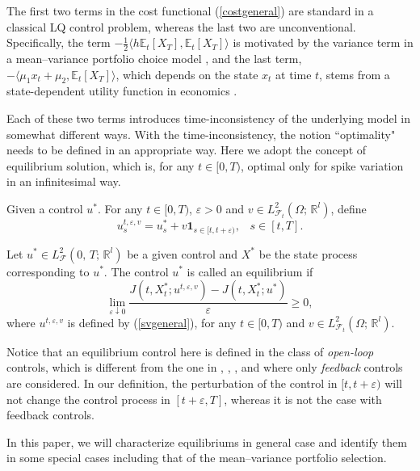 \documentclass[final]{siamltex}
\begin{document}
The first two terms in the cost  functional (\ref{costgeneral}) are standard in a classical LQ control problem, whereas the last two
are unconventional. Specifically, the term $- \frac{1}{2}{\langle  {h\mathbb E_t[ X_T], {\mathbb{E}_t\left[{X_T}\right]}} \rangle }$ is motivated by the variance term in a mean--variance
portfolio choice model \cite{HZ,ZL}, and the last term, $-{\langle  {\mu_1 x_t+\mu_2,  {\mathbb{E}_t\left[{X_T}\right]}} \rangle }$, which depends on the state $x_t$ at time $t$,  stems
from a state-dependent utility function in economics \cite{BMZ}.

Each of  these two terms introduces time-inconsistency of the underlying model in somewhat different ways. With the time-inconsistency, the notion
``optimality" needs to be defined in an appropriate way. Here we adopt the concept of equilibrium solution, which is, for any $t\in [0,T)$,  optimal
only for spike variation in an infinitesimal way.

Given a  control $u^*$. For any $t\in [0,T)$, $\varepsilon>0$ and $v\in L^2_{{{\mathcal F}}_t}(\Omega; \, {\mathbb{R}}^l)$,  define
\begin{equation}\label{svgeneral}
u^{t,\varepsilon,v}_s=u^*_s+v{{\mathbf 1}}_{s\in [t,t+\varepsilon)},\;\;\;s\in[t,T].
\end{equation}

\begin{definition}
Let $u^*\in L^2_{{\mathcal F}}(0, \, T; \, {\mathbb{R}}^l)$ be a given control and $X^*$ be the state process corresponding to $u^*$. The control $u^*$ is called an equilibrium
 if
$$\lim_{\varepsilon\downarrow 0} \frac{J(t,X^*_t; u^{t,\varepsilon,v})-J(t,X^*_t;u^*)}{\varepsilon}\ge 0,$$
where $u^{t,\varepsilon,v}$ is defined by (\ref{svgeneral}), for any $t\in [0,T)$ and $v\in L^2_{{{\mathcal F}}_t}(\Omega; \, {\mathbb{R}}^l)$.
\end{definition}

Notice that an equilibrium control here is defined in the class of {\it open-loop} controls, which is different from
the one in \cite{Basak}, \cite{BM}, \cite{BMZ},\cite{EL} and \cite{EP} where only {\it feedback} controls are considered. In our definition,
the perturbation of the control
in $[t, t+\varepsilon)$ will not change the control process in $[t+\varepsilon, T]$, whereas it is not the case with feedback controls.

In this paper, we will characterize equilibriums in general case and identify them in some special cases including that of the mean--variance
portfolio selection.
\end{document}
